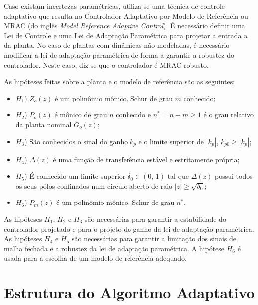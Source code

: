     Caso existam incertezas paramétricas, utiliza-se uma técnica de controle adaptativo que resulta no Controlador Adaptativo por Modelo de Referência ou MRAC (do inglês \emph{Model Reference Adaptive Control}). É necessário definir uma Lei de Controle e uma Lei de Adaptação Paramétrica para projetar a entrada $u$ da planta. No caso de plantas com dinâmicas não-modeladas, é necessário modificar a lei de adaptação paramétrica de forma a garantir a robustez do controlador. Neste caso, diz-se que o controlador é MRAC robusto.

    As hipóteses feitas sobre a planta e o modelo de referência são as seguintes:

    \begin{itemize}
        \item[] $H_1$) $Z_o(z)$ é um polinômio mônico, Schur de grau $m$ conhecido;
        \item[] $H_2$) $P_o(z)$ é mônico de grau $n$ conhecido e $n^* = n - m \geq 1$ é o grau relativo da planta nominal $G_o(z)$;
        \item[] $H_3$) São conhecidos o sinal do ganho $k_p$ e o limite superior de $|k_p|$, $k_{p0} \geq |k_p|$;
        \item[] $H_4$) $\Delta(z)$ é uma função de transferência estável e estritamente própria;
        \item[] $H_5$) É conhecido um limite superior $\delta_0 \in (0, \, 1)$ tal que $\Delta(z)$ possui todos os seus pólos confinados num círculo aberto de raio $|z| \geq \sqrt{\delta_0}$;
        \item[] $H_6$) $P_m(z)$ é um polinômio mônico, Schur de grau $n^*$.
    \end{itemize}

    As hipóteses $H_1$, $H_2$ e $H_3$ são necessárias para garantir a estabilidade do controlador projetado e para o projeto do ganho da lei de adaptação paramétrica. As hipóteses $H_4$ e $H_5$ são necessárias para garantir a limitação dos sinais de malha fechada e a robustez da lei de adaptação paramétrica. A hipótese $H_6$ é usada para a escolha de um modelo de referência adequado.

\section{Estrutura do Algoritmo Adaptativo}

